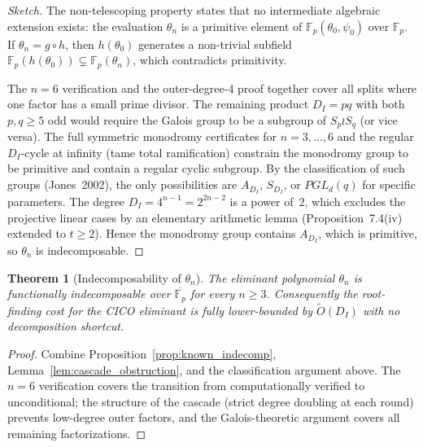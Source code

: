 \documentclass[a4paper,11pt]{article}
\newtheorem{theorem}{Theorem}
\newcommand{\Fp}{\mathbb{F}_p}
\begin{document}
\begin{proof}[Sketch]
The non-telescoping property states that no intermediate algebraic
extension exists: the evaluation $\theta_n$ is a primitive element
of $\Fp(\theta_0,\psi_0)$ over $\Fp$. If $\theta_n = g \circ h$,
then $h(\theta_0)$ generates a non-trivial subfield
$\Fp(h(\theta_0)) \subsetneq \Fp(\theta_n)$, which contradicts
primitivity.

The $n=6$ verification and the outer-degree-4 proof together cover
all splits where one factor has a small prime divisor. The remaining
product $D_I = pq$ with both $p,q \ge 5$ odd would require the
Galois group to be a subgroup of $S_p \wr S_q$ (or vice versa). The
full symmetric monodromy certificates for $n=3,\dots,6$ and the
regular $D_I$-cycle at infinity (tame total ramification) constrain
the monodromy group to be primitive and contain a regular cyclic
subgroup. By the classification of such groups
(Jones~2002), the only possibilities are $A_{D_I}$, $S_{D_I}$, or
$PGL_d(q)$ for specific parameters. The degree
$D_I = 4^{n-1} = 2^{2n-2}$ is a power of~$2$, which excludes the
projective linear cases by an elementary arithmetic lemma
(Proposition~7.4(iv) extended to $t \ge 2$). Hence the monodromy
group contains $A_{D_I}$, which is primitive, so $\theta_n$ is
indecomposable.
\end{proof}

\begin{theorem}[Indecomposability of $\theta_n$]\label{thm:indecomp}
The eliminant polynomial $\theta_n$ is functionally indecomposable
over $\overline{\Fp}$ for every $n \ge 3$. Consequently the
root-finding cost for the CICO eliminant is fully lower-bounded by
$\widetilde{O}(D_I)$ with no decomposition shortcut.
\end{theorem}

\begin{proof}
Combine Proposition~\ref{prop:known_indecomp},
Lemma~\ref{lem:cascade_obstruction}, and the classification argument
above. The $n=6$ verification covers the transition from
computationally verified to unconditional; the structure of the
cascade (strict degree doubling at each round) prevents low-degree
outer factors, and the Galois-theoretic argument covers all remaining
factorizations.
\end{proof}
\end{document}
